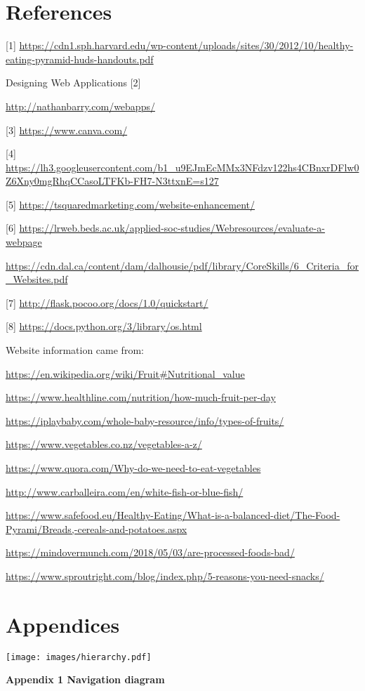 \documentclass[10pt, a4paper]{article}
\begin{document}
    \section{References}

    [1]
    \url{https://cdn1.sph.harvard.edu/wp-content/uploads/sites/30/2012/10/healthy-eating-pyramid-huds-handouts.pdf}

    Designing Web Applications
    [2]

    \url{http://nathanbarry.com/webapps/}

    [3]
    \url{https://www.canva.com/}

    [4]
    \url{https://lh3.googleusercontent.com/b1_u9EJmEcMMx3NFdzv122hs4CBnxrDFlw0Z6Xny0mgRhqCCasoLTFKb-FH7-N3ttxnE=s127}

    [5]
    \url{https://tsquaredmarketing.com/website-enhancement/}

    [6]
    \url{https://lrweb.beds.ac.uk/applied-soc-studies/Webresources/evaluate-a-webpage}

    \url{https://cdn.dal.ca/content/dam/dalhousie/pdf/library/CoreSkills/6_Criteria_for_Websites.pdf}

    [7]
    \url{http://flask.pocoo.org/docs/1.0/quickstart/}

    [8]
    \url{https://docs.python.org/3/library/os.html}

    Website information came from:

    \url{https://en.wikipedia.org/wiki/Fruit#Nutritional_value}

    \url{https://www.healthline.com/nutrition/how-much-fruit-per-day}

    \url{https://iplaybaby.com/whole-baby-resource/info/types-of-fruits/}

    \url{https://www.vegetables.co.nz/vegetables-a-z/}

    \url{https://www.quora.com/Why-do-we-need-to-eat-vegetables}

    \url{http://www.carballeira.com/en/white-fish-or-blue-fish/}

    \url{https://www.safefood.eu/Healthy-Eating/What-is-a-balanced-diet/The-Food-Pyrami/Breads,-cereals-and-potatoes.aspx}

    \url{https://mindovermunch.com/2018/05/03/are-processed-foods-bad/}

    \url{https://www.sproutright.com/blog/index.php/5-reasons-you-need-snacks/}

    \section{Appendices}

    \texttt{[image: images/hierarchy.pdf]}

    \textbf{Appendix 1 Navigation diagram}
    \vspace{2mm}
\end{document}
